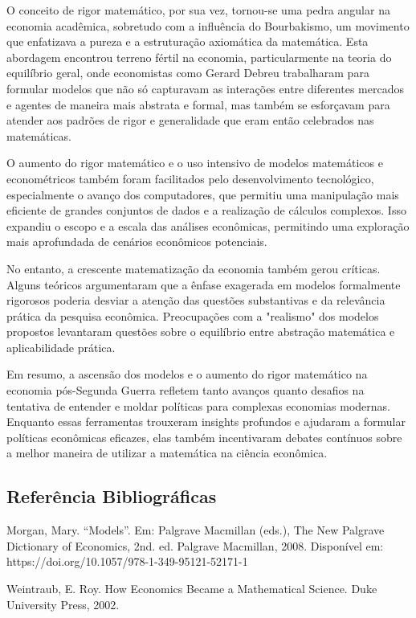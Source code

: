 \documentclass[a4paper,12pt]{article}[abntex2]
\begin{document}
O conceito de rigor matemático, por sua vez, tornou-se uma pedra angular na economia acadêmica, sobretudo com a influência do Bourbakismo, um movimento que enfatizava a pureza e a estruturação axiomática da matemática. Esta abordagem encontrou terreno fértil na economia, particularmente na teoria do equilíbrio geral, onde economistas como Gerard Debreu trabalharam para formular modelos que não só capturavam as interações entre diferentes mercados e agentes de maneira mais abstrata e formal, mas também se esforçavam para atender aos padrões de rigor e generalidade que eram então celebrados nas matemáticas.

O aumento do rigor matemático e o uso intensivo de modelos matemáticos e econométricos também foram facilitados pelo desenvolvimento tecnológico, especialmente o avanço dos computadores, que permitiu uma manipulação mais eficiente de grandes conjuntos de dados e a realização de cálculos complexos. Isso expandiu o escopo e a escala das análises econômicas, permitindo uma exploração mais aprofundada de cenários econômicos potenciais.

No entanto, a crescente matematização da economia também gerou críticas. Alguns teóricos argumentaram que a ênfase exagerada em modelos formalmente rigorosos poderia desviar a atenção das questões substantivas e da relevância prática da pesquisa econômica. Preocupações com a "realismo" dos modelos propostos levantaram questões sobre o equilíbrio entre abstração matemática e aplicabilidade prática.

Em resumo, a ascensão dos modelos e o aumento do rigor matemático na economia pós-Segunda Guerra refletem tanto avanços quanto desafios na tentativa de entender e moldar políticas para complexas economias modernas. Enquanto essas ferramentas trouxeram insights profundos e ajudaram a formular políticas econômicas eficazes, elas também incentivaram debates contínuos sobre a melhor maneira de utilizar a matemática na ciência econômica.

\subsection{\textbf{Referência Bibliográficas}}
Morgan, Mary. “Models”. Em: Palgrave Macmillan (eds.), The New Palgrave Dictionary of
Economics, 2nd. ed. Palgrave Macmillan, 2008. Disponível em: https://doi.org/10.1057/978-1-349-95121-52171-1

Weintraub, E. Roy. How Economics Became a Mathematical Science. Duke University Press,
2002.
\end{document}
